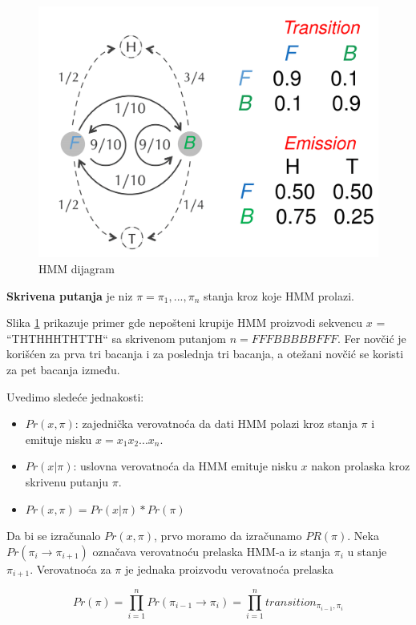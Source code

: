 \begin{figure}[H]
\centering
\includegraphics[width=0.5 \textwidth]{poglavlja/10/slike/HMM-dijagram.png}
\caption{HMM dijagram}
\label{slika: hmm}
\end{figure}



\begin{definicija}
    \textbf{Skrivena putanja} je niz $ \pi = \pi_1, ... , \pi_n $ stanja kroz koje HMM prolazi.
\end{definicija}

Slika \ref{slika: hmm} prikazuje primer gde nepošteni krupije HMM proizvodi sekvencu $ x $ = ``THTHHHTHTTH`` sa skrivenom putanjom $ n = FFFBBBBBFFF $. Fer novčić je korišćen za prva tri bacanja i za poslednja tri bacanja, a otežani novčić se koristi za pet bacanja između.

Uvedimo sledeće jednakosti:

\begin{itemize}
    \item $ Pr(x, \pi) $: zajednička verovatnoća da dati HMM
    polazi kroz stanja $ \pi $ i emituje nisku $ x = x_1 x_2
    . . . x_n $.
    \item $ Pr(x|\pi) $: uslovna verovatnoća da HMM
    emituje nisku $ x $ nakon prolaska kroz skrivenu putanju $ \pi $.
    \item $ Pr(x, \pi) = Pr(x|\pi) * Pr(\pi) $
\end{itemize}

Da bi se izračunalo $ Pr(x, \pi) $, prvo moramo da izračunamo $ PR(\pi) $. Neka $ Pr(\pi_i \rightarrow \pi_{i+1}) $ označava verovatnoću prelaska HMM-a iz stanja $ \pi_i $ u stanje $ \pi_{i+1} $. Verovatnoća za $ \pi $ je jednaka proizvodu verovatnoća prelaska 

\begin{equation}
    Pr(\pi) = {\displaystyle \prod_{i=1}^n Pr(\pi_{i-1} \rightarrow \pi_i)} = {\displaystyle \prod_{i=1}^n transition_{\pi_{i-1}, \pi_i}}
\end{equation}

